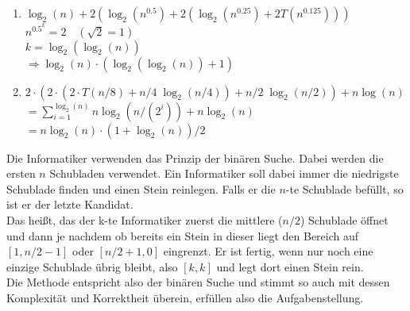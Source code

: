 \documentclass[a4paper,11pt]{article}             %
\begin{document}
\begin{enumerate}
\begin{enumerate}
\item
$\log_2(n) + 2(\log_2(n^{0.5}) + 2(\log_2(n^{0.25}) + 2T(n^{0.125})))$\\
$n^{0.5^k} = 2 \quad (\sqrt{2}=1)$\\
$k=\log_2(\log_2(n))$\\
$\Rightarrow \log_2(n)\cdot(\log_2(\log_2(n))+1)$

\item
$2\cdot(2\cdot(2\cdot T(n/8)+n/4 \; \log_2(n/4)) + n/2 \; \log_2(n/2)) + n \log(n)$\\
$=\sum\limits_{i=1}^{\log_2(n)} n \log_2(n/(2^i)) + n \log_2(n)$\\
$=n \log_2(n) \cdot (1+\log_2(n))/2$

\end{enumerate}

\end{enumerate}


Die Informatiker verwenden das Prinzip der binären Suche. Dabei werden die ersten $n$ Schubladen verwendet. Ein Informatiker soll dabei immer die niedrigste Schublade finden und einen Stein reinlegen. Falls er die $n$-te Schublade befüllt, so ist er der letzte Kandidat.\\
Das heißt, das der k-te Informatiker zuerst die mittlere ($n/2$) Schublade öffnet und dann je nachdem ob bereits ein Stein in dieser liegt den Bereich auf $[1, n/2 -1]$ oder $[n/2 + 1, 0]$ eingrenzt. Er ist fertig, wenn nur noch eine einzige Schublade übrig bleibt, also $[k, k]$ und legt dort einen Stein rein.\\
Die Methode entspricht also der binären Suche und stimmt so auch mit dessen Komplexität und Korrektheit überein, erfüllen also die Aufgabenstellung.

\end{document}
